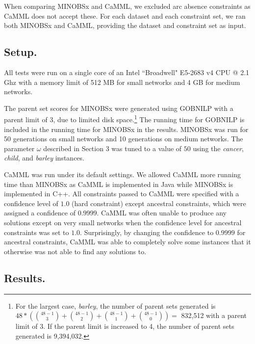 \documentclass[twoside,11pt]{article}
\begin{document}
When comparing MINOBSx and CaMML, we excluded arc absence constraints as CaMML does not accept these. 
For each dataset and each constraint set, we ran both MINOBSx and CaMML, providing the dataset and constraint set as input. 

\subsection{Setup.}

All tests were run on a single core of an Intel ``Broadwell" E5-2683 v4 CPU @ 2.1 Ghz with a memory limit of 512 MB for small networks and 4 GB for medium networks. 

\smallskip
The parent set scores for MINOBSx were generated using GOBNILP \citep{Bartlett2017} with a parent limit of 3, due to limited disk space.\footnote{For the largest case, \emph{barley}, the number of parent sets
generated is $48*({48-1 \choose 3} + {48-1 \choose 2} + {48-1 \choose 1} + {48-1 \choose 0}) = $ 832,512 with a parent limit of 3. If the parent limit is increased to 4, the number of parent sets generated is 9,394,032.}
The running time for GOBNILP is included in 
the running time for MINOBSx in the results. MINOBSx was run for 50 generations on small networks and 10 generations on medium networks. The parameter
$\omega$ described in Section 3 was tuned to a value of $50$ using the \emph{cancer}, \emph{child}, and \emph{barley} instances. 

\smallskip
CaMML was run under its default settings. We allowed CaMML more running time than MINOBSx as CaMML
is implemented in Java while MINOBSx is implemented in C++. All constraints passed to CaMML were specified with a confidence level of $1.0$ (hard constraint) except ancestral constraints, which were assigned a confidence of $0.9999$. CaMML was often unable to produce any solutions except on very small networks when the 
confidence level for ancestral constraints was set to $1.0$. Surprisingly, by changing the confidence to $0.9999$ for ancestral constraints, CaMML was able to completely solve
some instances that it otherwise was not able to find any solutions to. 

\subsection{Results.}
\end{document}
